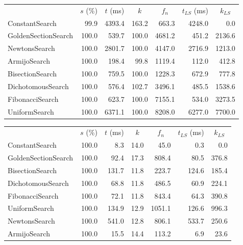 \documentclass[a4paper,english,titlepage,12pt]{article}
\begin{document}
\begin{center}
\label{tab:performance_results_NE_CGM}
\begin{tabular}{|l|r|r|r|r|r|r|}
\hline
\rowcolor{gray!25}
\multicolumn{1}{|c|}{Line Search Name} & \multicolumn{1}{c|}{$s$ (\%)} & \multicolumn{1}{c|}{$t$ (ms)} & \multicolumn{1}{c|}{$k$} & \multicolumn{1}{c|}{$f_n$} & \multicolumn{1}{c|}{$t_{LS}$ (ms)} & \multicolumn{1}{c|}{$k_{LS}$} \\
ConstantSearch & 99.9 & 4393.4 & 163.2 & 663.3 & 4248.0 & 0.0 \\
GoldenSectionSearch & 100.0 & 539.7 & 100.0 & 4681.2 & 451.2 & 2136.6 \\
NewtonsSearch & 100.0 & 2801.7 & 100.0 & 4147.0 & 2716.9 & 1213.0 \\
ArmijoSearch & 100.0 & 198.4 & 99.8 & 1119.4 & 112.0 & 412.8 \\
BisectionSearch & 100.0 & 759.5 & 100.0 & 1228.3 & 672.9 & 777.8 \\
DichotomousSearch & 100.0 & 576.4 & 102.7 & 3496.1 & 485.5 & 1538.6 \\
FibonacciSearch & 100.0 & 623.7 & 100.0 & 7155.1 & 534.0 & 3273.5 \\
UniformSearch & 100.0 & 6371.1 & 100.0 & 8208.0 & 6277.0 & 7700.0 \\
\hline
\end{tabular}
\end{center}

\begin{center}
\label{tab:performance_results_NE_HBM}
\begin{tabular}{|l|r|r|r|r|r|r|}
\hline
\rowcolor{gray!25}
\multicolumn{1}{|c|}{Line Search Name} & \multicolumn{1}{c|}{$s$ (\%)} & \multicolumn{1}{c|}{$t$ (ms)} & \multicolumn{1}{c|}{$k$} & \multicolumn{1}{c|}{$f_n$} & \multicolumn{1}{c|}{$t_{LS}$ (ms)} & \multicolumn{1}{c|}{$k_{LS}$} \\
ConstantSearch & 100.0 & 8.3 & 14.0 & 45.0 & 0.3 & 0.0 \\
GoldenSectionSearch & 100.0 & 92.4 & 17.3 & 808.4 & 80.5 & 376.8 \\
BisectionSearch & 100.0 & 131.7 & 11.8 & 223.7 & 124.6 & 185.4 \\
DichotomousSearch & 100.0 & 68.8 & 11.8 & 486.5 & 60.9 & 224.1 \\
FibonacciSearch & 100.0 & 72.1 & 11.8 & 843.4 & 64.3 & 390.8 \\
UniformSearch & 100.0 & 134.9 & 12.9 & 1051.1 & 126.6 & 996.3 \\
NewtonsSearch & 100.0 & 541.0 & 12.8 & 806.1 & 533.7 & 250.6 \\
ArmijoSearch & 100.0 & 15.5 & 14.4 & 113.2 & 6.9 & 23.6 \\
\hline
\end{tabular}
\end{center}
\end{document}
